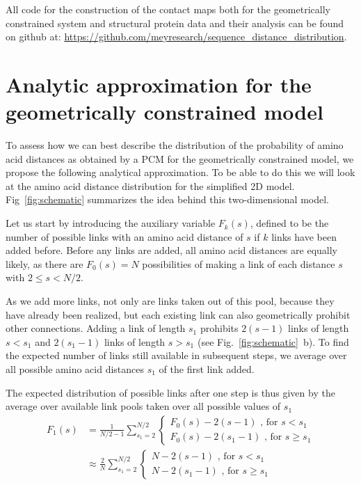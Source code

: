 \documentclass[
reprint,
twocolumn,
amsmath,amssymb,superscriptaddress,aps,
pre]{revtex4-1}
\newcommand{\red}[1]{\textcolor{red!80!black}{#1}}
\begin{document}
All code for the construction of the contact maps both for the geometrically constrained system and structural protein data and their analysis can be found on github at: \url{https://github.com/meyresearch/sequence_distance_distribution}.



\section{Analytic approximation for the geometrically constrained model}

To assess how we can best describe the distribution of the probability of amino acid distances as obtained by a PCM for the geometrically constrained model, we propose the following analytical approximation. To be able to do this we will look at the amino acid distance distribution for the simplified 2D model. Fig~\ref{fig:schematic} summarizes the idea behind this two-dimensional model.

Let us start by introducing the auxiliary variable $F_k(s)$, defined to be the number of possible links with an amino acid distance of $s$ if $k$ links have been added before. Before any links are added, all amino acid distances are equally likely, as there are $F_0(s)=N$ possibilities of making a link of each distance $s$ with $2\leq s < N/2$.

As we add more links, not only are links taken out of this pool, because they have already been realized, \red{but} each existing link can also geometrically prohibit other connections. Adding a link of length $s_1$ prohibits $2(s-1)$ links of length $s<s_1$ and $2(s_1-1)$ links of length $s>s_1$ (see Fig.~\ref{fig:schematic}~b). To find the expected number of links still available in subsequent steps, we average over all possible amino acid distances $s_1$ of the first link added.

The expected distribution of possible links after one step is \red{thus given} by the average over available link pools taken over all possible values of $s_1$
\begin{align}
    F_1(s)&=\frac{1}{N/2-1} \sum_{s_1=2}^{N/2}{ \begin{cases}
    F_0(s)-2(s-1) \text{ , for } s<s_1\\
    F_0(s)-2(s_1 -1)\text{ , for } s\geq s_1
    \end{cases}}
    \nonumber \\
    &\approx\frac{2}{N} \sum_{s_1=2}^{N/2} { \begin{cases}
    N-2(s-1) \text{ , for } s<s_1\\
    N-2(s_1 -1)\text{ , for } s\geq s_1
    \end{cases}}
\end{align}
\end{document}
